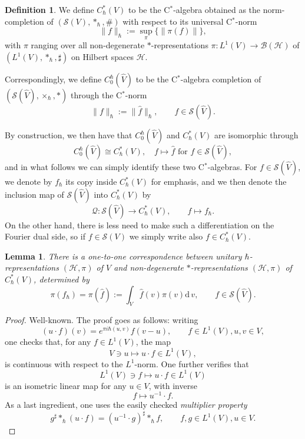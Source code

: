 \documentclass[11pt, reqno]{amsart}
\newtheorem{lemma}[theorem]{Lemma}
\theoremstyle{definition}
\newtheorem{defn}[theorem]{Definition}
\numberwithin{equation}{section}
\def\Hc{\mathcal H}
\def\Qc{\mathcal Q}
\def\Sc{\mathcal S}
\newcommand{\Hsp}{\mathcal{H}}
\newcommand{\Bc}{\mathcal{B}}
\newcommand{\rd}{\mathrm{d}\!\,}
\begin{document}
\begin{defn}
We define  $C_{\hbar}^*(V)$ to be the C$^*$-algebra obtained as the norm-completion of $(\Sc(V),\ast_{\hbar},\#)$ with respect to its universal C$^*$-norm
\[
\|f\|_{\hbar} := \sup_{\pi} \{\|\pi(f)\|\},
\]
with $\pi$ ranging over all non-degenerate $*$-representations $\pi \colon L^1(V) \rightarrow \Bc(\Hc)$ of $(L^1(V),\ast_{\hbar},\sharp)$ on Hilbert spaces $\Hsp$. 

Correspondingly, we define $C_0^{\hbar}(\hat{V})$ to be the C$^*$-algebra completion of $(\Sc(\hat{V}),\times_{\hbar},*)$ through the C$^*$-norm 
\[
\|f\|_{\hbar} := \|\hat{f}\|_{\hbar},\qquad f\in \Sc(\hat{V}). 
\]
\end{defn}
By construction, we then have that $C_0^{\hbar}(\hat{V})$ and $C^*_{\hbar}(V)$ are isomorphic through 
\[
C_0^{\hbar}(\hat{V})\cong C^*_{\hbar}(V),\quad f\mapsto\hat{f}\textrm{ for }f\in \Sc(\hat{V}),
\]
and in what follows we can simply identify these two C$^*$-algebras. For $f\in \Sc(\hat{V})$, we denote by $f_{\hbar}$ its copy inside $C_{\hbar}^*(V)$ for emphasis, and we then denote the inclusion map of $\Sc(\hat{V})$ into $C^*_{\hbar}(V)$ by  
\begin{equation}\label{EqQuantMap}
\Qc\colon  \Sc(\hat{V}) \rightarrow C^*_{\hbar}(V),\qquad f \mapsto f_{\hbar}.
\end{equation}
On the other hand, there is less need to make such a differentiation on the Fourier dual side, so if $f\in \Sc(V)$ we simply write also $
f \in C^*_{\hbar}(V)$. 


\begin{lemma}\label{LemUnivProp}
There is a one-to-one correspondence between unitary $\hbar$-representations $(\Hsp,\pi)$ of $V$ and non-degenerate $*$-representations $(\Hsp,\pi)$ of $C^*_{\hbar}(V)$, determined by 
\begin{equation}\label{EqExtRep}
\pi(f_{\hbar}) = \pi(\hat{f}) := \int_V \hat{f}(v) \pi(v)\rd v, \qquad f\in \Sc(\hat{V}).
\end{equation}
\end{lemma}
\begin{proof}
Well-known. The proof goes as follows: writing
\[
(u \cdot f)(v) =  e^{\pi i \hbar(u,v)}f(v-u),\qquad f\in L^1(V),u,v\in V, 
\]
one checks that, for any $f\in L^1(V)$, the map
\[
V\ni u \mapsto u\cdot f\in L^1(V),
\]
is continuous with respect to the $L^1$-norm. One further verifies that 
\[
L^1(V) \ni f\mapsto u\cdot f \in L^1(V)
\]
is an isometric linear map for any $u\in V$, with inverse
\[
f \mapsto u^{-1}\cdot f.
\]
As a last ingredient, one uses the easily checked \emph{multiplier property}
\[
g^{\sharp} \ast_{\hbar} (u\cdot f) = (u^{-1}\cdot g)^{\sharp}\ast_{\hbar} f,\qquad f,g\in L^1(V),u\in V. 
\]
\end{proof}
\end{document}

